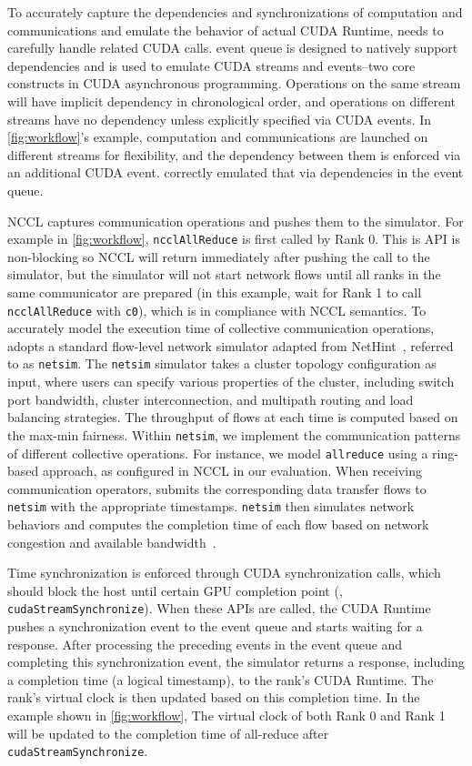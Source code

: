 To accurately capture the dependencies and synchronizations of computation and communications and emulate the behavior of actual CUDA Runtime, \sys needs to carefully handle related CUDA calls. \sys event queue is designed to natively support dependencies and is used to emulate CUDA streams and events--two core constructs in CUDA asynchronous programming. Operations on the same stream will have implicit dependency in chronological order, and operations on different streams have no dependency unless explicitly specified via CUDA events. In \autoref{fig:workflow}'s example, computation and communications are launched on different streams for flexibility, and the dependency between them is enforced via an additional CUDA event. \sys correctly emulated that via dependencies in the event queue.

\sys NCCL captures communication operations and pushes them to the \sys simulator. For example in \autoref{fig:workflow}, \texttt{ncclAllReduce} is first called by Rank 0. This is API is non-blocking so \sys NCCL will return immediately after pushing the call to the simulator, but the simulator will not start network flows until all ranks in the same communicator are prepared (in this example, wait for Rank 1 to call \texttt{ncclAllReduce} with \texttt{c0}), which is in compliance with NCCL semantics.
To accurately model the execution time of collective communication operations, \sys adopts a standard flow-level network simulator adapted from NetHint~\cite{chen2022nethint}, referred to as \texttt{netsim}. The \texttt{netsim} simulator takes a cluster topology configuration as input, where users can specify various properties of the cluster, including switch port bandwidth, cluster interconnection, and multipath routing and load balancing strategies. The throughput of flows at each time is computed based on the max-min fairness. Within \texttt{netsim}, we implement the communication patterns of different collective operations. For instance, we model \texttt{allreduce} using a ring-based approach, as configured in NCCL in our evaluation. When receiving communication operators, \sys submits the corresponding data transfer flows to \texttt{netsim} with the appropriate timestamps. \texttt{netsim} then simulates network behaviors and computes the completion time of each flow based on network congestion and available bandwidth~\cite{chen2022nethint, wu2024mccs}.

Time synchronization is enforced through CUDA synchronization calls, which should block the host until certain GPU completion point (\eg, \texttt{cudaStreamSynchronize}).
When these APIs are called, the \sys CUDA Runtime pushes a synchronization event to the event queue and starts waiting for a response. After processing the preceding events in the event queue and completing this synchronization event, the simulator returns a response, including a completion time (a logical timestamp), to the rank's \sys CUDA Runtime. The rank's virtual clock is then updated based on this completion time. In the example shown in \autoref{fig:workflow}, The virtual clock of both Rank 0 and Rank 1 will be updated to the completion time of all-reduce after \texttt{cudaStreamSynchronize}.

